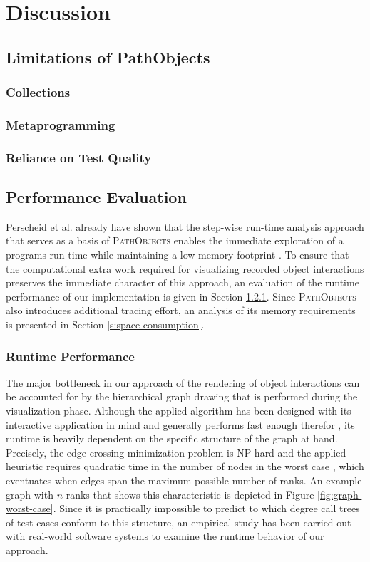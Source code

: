 \chapter{Discussion}
\label{c:discussion}

\section{Limitations of PathObjects}
\subsection{Collections}
\subsection{Metaprogramming}
\subsection{Reliance on Test Quality}

\section{Performance Evaluation}
Perscheid et al. already have shown that the step-wise run-time analysis approach that serves as a basis of \textsc{PathObjects} enables the immediate exploration of a programs run-time while maintaining a low memory footprint  \cite{perscheid_immediacy_2010}.
To ensure that the computational extra work required for visualizing recorded object interactions preserves the immediate character of this approach, an evaluation of the runtime performance of our implementation is given in Section \ref{s:runtime-performance}.
Since \textsc{PathObjects} also introduces additional tracing effort, an analysis of its memory requirements is presented in Section \ref{s:space-consumption}.

\subsection{Runtime Performance}
\label{s:runtime-performance}
The major bottleneck in our approach of the rendering of object interactions can be accounted for by the hierarchical graph drawing that is performed during the visualization phase.
Although the applied algorithm has been designed with its interactive application in mind and generally performs fast enough therefor \cite{gansner_technique_1993}, its runtime is heavily dependent on the specific structure of the graph at hand.
Precisely, the edge crossing minimization problem is NP-hard and the applied heuristic requires quadratic time in the number of nodes in the worst case \cite{tamassia_handbook_2013}, which eventuates when edges span the maximum possible number of ranks.
An example graph with $n$ ranks that shows this characteristic is depicted in Figure \ref{fig:graph-worst-case}.
Since it is practically impossible to predict to which degree call trees of test cases conform to this structure, an empirical study has been carried out with real-world software systems to examine the runtime behavior of our approach.

